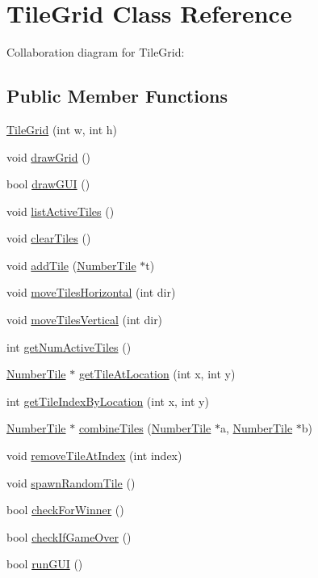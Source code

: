 \hypertarget{classTileGrid}{}\section{Tile\+Grid Class Reference}
\label{classTileGrid}


Collaboration diagram for Tile\+Grid\+:
\subsection*{Public Member Functions}
\begin{DoxyCompactItemize}
\item 
\hyperlink{classTileGrid_ad275d9124d5485bfc88adb3626089fdf}{Tile\+Grid} (int w, int h)
\item 
void \hyperlink{classTileGrid_a3da76928cfce1d715cefde4c80759187}{draw\+Grid} ()
\item 
bool \hyperlink{classTileGrid_a787046588114e5a17a2869113e53b35d}{draw\+G\+UI} ()
\item 
void \hyperlink{classTileGrid_a24ab97ce925a5bbdd467c7d91d2d28c7}{list\+Active\+Tiles} ()
\item 
void \hyperlink{classTileGrid_a96339e9ad2afee46b58ec68ceb8f417c}{clear\+Tiles} ()
\item 
void \hyperlink{classTileGrid_a237a5a05afb632cc9b59f1f490a42803}{add\+Tile} (\hyperlink{classNumberTile}{Number\+Tile} $\ast$t)
\item 
void \hyperlink{classTileGrid_ab9e350d439063b8286237b5b1c976590}{move\+Tiles\+Horizontal} (int dir)
\item 
void \hyperlink{classTileGrid_a12cda2e17c1fa615d056aee8d523c708}{move\+Tiles\+Vertical} (int dir)
\item 
int \hyperlink{classTileGrid_a2743c957717c63450c060b160b8132b1}{get\+Num\+Active\+Tiles} ()
\item 
\hyperlink{classNumberTile}{Number\+Tile} $\ast$ \hyperlink{classTileGrid_a2662d958559018aa7f49d7153922c6af}{get\+Tile\+At\+Location} (int x, int y)
\item 
int \hyperlink{classTileGrid_a4e42ec67975cf1be6cac85df311b8bae}{get\+Tile\+Index\+By\+Location} (int x, int y)
\item 
\hyperlink{classNumberTile}{Number\+Tile} $\ast$ \hyperlink{classTileGrid_a2edc90ec1238786d746f8db1219ca056}{combine\+Tiles} (\hyperlink{classNumberTile}{Number\+Tile} $\ast$a, \hyperlink{classNumberTile}{Number\+Tile} $\ast$b)
\item 
void \hyperlink{classTileGrid_ab5e670e6b91d87ea12237d25f65b5f2a}{remove\+Tile\+At\+Index} (int index)
\item 
void \hyperlink{classTileGrid_a01cbaad58637ed2a500beebc1ff784eb}{spawn\+Random\+Tile} ()
\item 
bool \hyperlink{classTileGrid_a3840454c31ff44ab61a8afdc66ddb97d}{check\+For\+Winner} ()
\item 
bool \hyperlink{classTileGrid_aab03be042d185457b04d9468952df68f}{check\+If\+Game\+Over} ()
\item 
bool \hyperlink{classTileGrid_a599c5125eee64b38972ad27027ab3def}{run\+G\+UI} ()
\end{DoxyCompactItemize}
